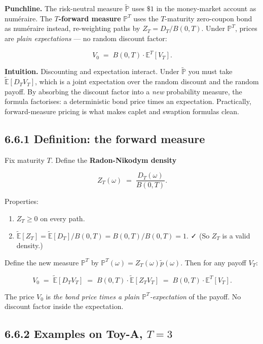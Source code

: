 \documentclass[
  10pt,
  twoside]{book}
\providecommand{\tightlist}{%
  \setlength{\itemsep}{0pt}\setlength{\parskip}{0pt}}
\begin{document}
\textbf{Punchline.} The risk-neutral measure \(\tilde{\mathbb P}\) uses
\(\$1\) in the money-market account as numéraire. The
\textbf{\(T\)-forward measure} \(\mathbb P^T\) uses the \(T\)-maturity
zero-coupon bond as numéraire instead, re-weighting paths by
\(Z_T = D_T / B(0, T)\). Under \(\mathbb P^T\), prices are \emph{plain
expectations} --- no random discount factor:

\[V_0 \;=\; B(0, T) \cdot \mathbb E^T[V_T].\]

\textbf{Intuition.} Discounting and expectation interact. Under
\(\tilde{\mathbb P}\) you must take \(\tilde{\mathbb E}[D_T V_T]\),
which is a joint expectation over the random discount and the random
payoff. By absorbing the discount factor into a \emph{new} probability
measure, the formula factorises: a deterministic bond price times an
expectation. Practically, forward-measure pricing is what makes caplet
and swaption formulas clean.

\subsection{6.6.1 Definition: the forward
measure}\label{definition-the-forward-measure}

Fix maturity \(T\). Define the \textbf{Radon-Nikodym density}

\[Z_T(\omega) \;=\; \frac{D_T(\omega)}{B(0, T)}.\]

Properties:

\begin{enumerate}
\def\labelenumi{\arabic{enumi}.}
\tightlist
\item
  \(Z_T \ge 0\) on every path.
\item
  \(\tilde{\mathbb E}[Z_T] = \tilde{\mathbb E}[D_T] / B(0, T) = B(0, T) / B(0, T) = 1\).
  ✓ (So \(Z_T\) is a valid density.)
\end{enumerate}

Define the new measure \(\mathbb P^T\) by
\(\mathbb P^T(\omega) = Z_T(\omega) \tilde p(\omega)\). Then for any
payoff \(V_T\):

\[V_0 \;=\; \tilde{\mathbb E}[D_T V_T] \;=\; B(0, T) \cdot \tilde{\mathbb E}[Z_T V_T] \;=\; B(0, T) \cdot \mathbb E^T[V_T].\]

The price \(V_0\) is \emph{the bond price times a plain
\(\mathbb P^T\)-expectation} of the payoff. No discount factor inside
the expectation.

\subsection{\texorpdfstring{6.6.2 Examples on Toy-A,
\(T = 3\)}{6.6.2 Examples on Toy-A, T = 3}}\label{examples-on-toy-a-t-3}
\end{document}
